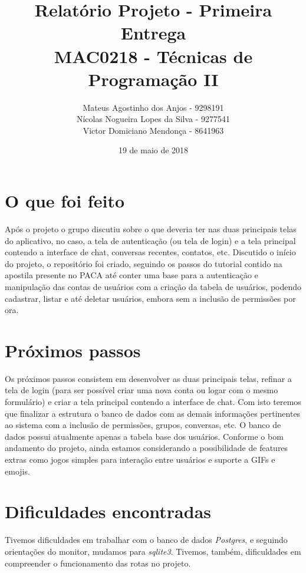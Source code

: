 \documentclass[11pt,a4paper,titlepage]{article}
\title{Relatório Projeto - Primeira Entrega \\
MAC0218 - Técnicas de Programação II}
\author{Mateus Agostinho dos Anjos - 9298191\\Nícolas Nogueira Lopes da Silva - 9277541\\Victor Domiciano Mendonça - 8641963}
\date{19 de maio de 2018}
\begin{document}
\maketitle

\section{O que foi feito}
	Após o projeto o grupo discutiu sobre o que deveria ter nas duas principais telas do aplicativo, no caso, a tela de autenticação (ou tela de login) e a tela principal contendo a interface de chat, conversas recentes, contatos, etc.
    Discutido o início do projeto, o repositório foi criado, seguindo os passos do tutorial contido na apostila presente no PACA até conter uma base para a autenticação e manipulação das contas de usuários com a criação da tabela de usuários, podendo cadastrar, listar e até deletar usuários, embora sem a inclusão de permissões por ora.

\section{Próximos passos}

Os próximos passos consistem em desenvolver as duas principais telas, refinar a tela de login (para ser possível criar uma nova conta ou logar com o mesmo formulário) e criar a tela principal contendo a interface de chat. Com isto teremos que finalizar a estrutura o banco de dados com as demais informações pertinentes ao sistema com a inclusão de permissões, grupos, conversas, etc. O banco de dados possui atualmente apenas a tabela base dos usuários.
Conforme o bom andamento do projeto, ainda estamos considerando a possibilidade de features extras como jogos simples para interação entre usuários e suporte a GIFs e emojis.

\section{Dificuldades encontradas}

Tivemos dificuldades em trabalhar com o banco de dados \textit{Postgres}, e seguindo orientações do monitor, mudamos para \textit{sqlite3}. Tivemos, também, dificuldades em compreender o funcionamento das rotas no projeto.
\end{document}
